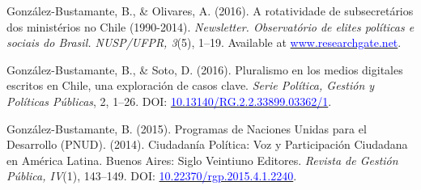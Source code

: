 \begin{publications}
\begin{benumerate}{8}

\item{González-Bustamante, B., \& Olivares, A. (2016). A rotatividade de subsecretários dos ministérios no Chile (1990-2014). {\itshape Newsletter. Observat\'orio de elites pol\'iticas e sociais do Brasil. NUSP/UFPR, 3}(5), 1--19. Available at \href{https://www.researchgate.net/publication/321993740_A_rotatividade_de_subsecretarios_dos_ministerios_no_Chile_1990-2014}{\textcolor{blue}{www.researchgate.net}}.}\vspace{1mm}


\item{González-Bustamante, B., \& Soto, D. (2016). Pluralismo en los medios digitales escritos en Chile, una exploración de casos clave. {\itshape Serie Política, Gestión y Políticas Públicas}, 2, 1--26. DOI: \href{http://doi.org/10.13140/RG.2.2.33899.03362/1}{\textcolor{blue}{10.13140/RG.2.2.33899.03362/1}}.}\vspace{1mm}


\item{González-Bustamante, B. (2015). Programas de Naciones Unidas para el Desarrollo (PNUD). (2014). Ciudadanía Política: Voz y Participación Ciudadana en América Latina. Buenos Aires: Siglo Veintiuno Editores. {\itshape Revista de Gestión Pública, IV}(1), 143--149. DOI: \href{https://doi.org/10.22370/rgp.2015.4.1.2240}{\textcolor{blue}{10.22370/rgp.2015.4.1.2240}}.}

\end{benumerate}

\end{publications}

